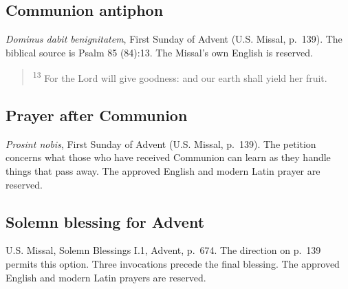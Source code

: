 \subsection{Communion antiphon}
\label{proper-communion}
\textit{Dominus dabit benignitatem}, First Sunday of Advent (U.S. Missal, p.~139). The biblical source is Psalm 85 (84):13. The Missal's own English is reserved.
\begin{quote}
\textsuperscript{13} For the Lord will give goodness: and our earth shall yield her fruit.
\end{quote}

\subsection{Prayer after Communion}
\label{proper-after-communion}
\textit{Prosint nobis}, First Sunday of Advent (U.S. Missal, p.~139). The petition concerns what those who have received Communion can learn as they handle things that pass away. The approved English and modern Latin prayer are reserved.

\subsection{Solemn blessing for Advent}
\label{proper-advent-blessing}
U.S. Missal, Solemn Blessings I.1, Advent, p.~674. The direction on p.~139 permits this option. Three invocations precede the final blessing. The approved English and modern Latin prayers are reserved.
